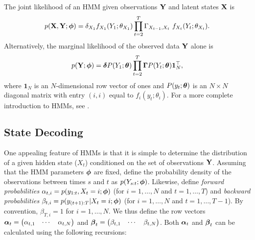 The joint likelihood of an HMM given observations $\mathbf{Y}$ and latent states $\mathbf{X}$ is
%
\begin{equation}
    p(\mathbf{X},\mathbf{Y};\boldsymbol{\phi}) = \delta_{X_1} f_{X_1}(Y_1; \theta_{X_1}) \prod_{t=2}^T \Gamma_{X_{t-1},X_t} ~ f_{X_t}(Y_t ; \theta_{X_t}).
    \label{eqn:like}
\end{equation}
%
Alternatively, the marginal likelihood of the observed data $\mathbf{Y}$ alone is 
%
\begin{equation}
    p(\mathbf{Y};\boldsymbol{\phi}) = \boldsymbol{\delta} P(Y_1;\boldsymbol{\theta}) \prod_{t=2}^T \boldsymbol{\Gamma} P(Y_t;\boldsymbol{\theta}) \mathbf{1}^\top_N,
    \label{eqn:like_marginal}
\end{equation}
%
where $\mathbf{1}_N$ is an $N$-dimensional row vector of ones and $P(y_t;\boldsymbol{\theta})$ is an $N \times N$ diagonal matrix with entry $(i,i)$ equal to $f_{i}(y_t; \theta_{i})$. For a more complete introduction to HMMs, see \citet{Zucchini:2016}.
%
\subsection{State Decoding}
%
%
%
%
%
%
%
%

One appealing feature of HMMs is that it is simple to determine the distribution of a given hidden state ($X_t$) conditioned on the set of observations $\mathbf{Y}$. Assuming that the HMM parameters $\boldsymbol{\phi}$ are fixed, define the probability density of the observations between times $s$ and $t$ as $p(Y_{s:t};\boldsymbol{\phi})$. Likewise, define \textit{forward probabilities} $\alpha_{t,i} = p(y_{1:t},X_t = i;\boldsymbol{\phi})$ (for $i = 1,\ldots,N$ and $t = 1,\ldots,T$) and \textit{backward probabilities} $\beta_{t,i} = p(y_{(t+1):T}|X_t = i;\boldsymbol{\phi})$ (for $i = 1,\ldots,N$ and $t = 1,\ldots,T-1$). By convention, $\beta_{T,i} = 1$ for $i = 1,\ldots,N$. We thus define the row vectors $\boldsymbol{\alpha}_t = \begin{pmatrix} \alpha_{t,1} & \cdots & \alpha_{t,N} \end{pmatrix}$ and $\boldsymbol{\beta}_t = \begin{pmatrix} \beta_{t,1} & \cdots & \beta_{t,N} \end{pmatrix}$. Both $\boldsymbol{\alpha}_t$ and $\boldsymbol{\beta}_t$ can be calculated using the following recursions: %

